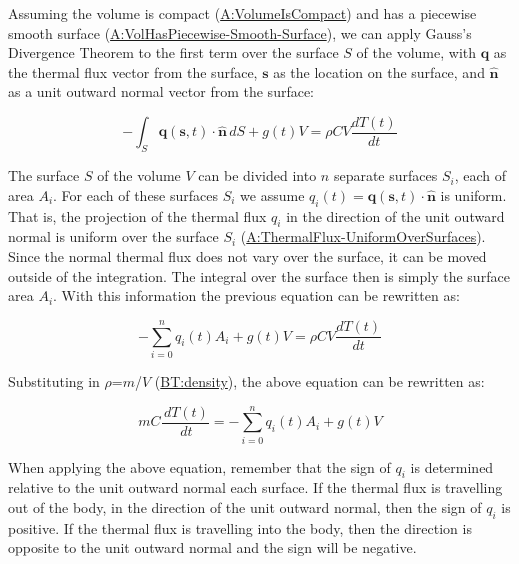 \documentclass[12pt]{article}
\begin{document}
Assuming the volume is compact
(\hyperref[assumpPiecewiseSmooth]{A:VolumeIsCompact}) and has a piecewise smooth
surface (\hyperref[assumpPiecewiseSmooth]{A:VolHasPiecewise-Smooth-Surface}), we
can apply Gauss's Divergence Theorem to the first term over the surface $S$ of
the volume, with $\symbf{q}$ as the thermal flux vector from the surface,
$\textbf{s}$ as the location on the surface, and $\symbf{\hat{n}}$ as a unit
outward normal vector from the surface:

\begin{displaymath}
-\int_{S}{\symbf{q}(\textbf{s}, t)\cdot{}\symbf{\hat{n}}}\,dS+ g(t) V=ρ C V \frac{dT(t)}{dt}
\end{displaymath}
        
The surface $S$ of the volume $V$ can be divided into $n$ separate surfaces
$S_i$, each of area $A_i$.  For each of these surfaces $S_i$ we assume $q_i (t)
= \mathbf{q}(\mathbf{s}, t) \cdot \symbf{\hat{n}}$ is uniform. That is, the
projection of the thermal flux $q_i$ in the direction of the unit outward normal
is uniform over the surface $S_i$
(\hyperref[assumpUnifThermFlux]{A:ThermalFlux-UniformOverSurfaces}).  Since the
normal thermal flux does not vary over the surface, it can be moved outside of
the integration.  The integral over the surface then is simply the surface area
$A_i$. With this information the previous equation can be rewritten as:

\begin{displaymath}
-\sum_{i=0}^n {q_i(t)} {A_i} + g(t) V = ρ C V \frac{dT(t)}{dt}
\end{displaymath}

Substituting in $ρ$=$m$/$V$ (\hyperref[BT:density]{BT:density}), the above
equation can be rewritten as:

\begin{displaymath}
m C \frac{\,dT(t)}{\,dt}= -\sum_{i=0}^n {q_i(t)} {A_i} + g(t) V
\end{displaymath}

When applying the above equation, remember that the sign of $q_i$ is determined
relative to the unit outward normal each surface.  If the thermal flux is
travelling out of the body, in the direction of the unit outward normal, then
the sign of $q_i$ is positive.  If the thermal flux is travelling into the body,
then the direction is opposite to the unit outward normal and the sign will be
negative.

\end{document}
